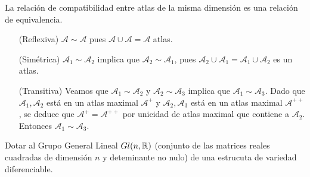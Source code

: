 \documentclass[twoside]{report}
\newcommand {\At} {{\mathcal{A}}}
\begin{document}
\begin{prop}
La relación de compatibilidad entre atlas de la misma dimensión es una relación de equivalencia.
\end{prop}

\begin{dem}\mbox{}
\begin{itemize}
	\item[(Reflexiva)] $\At \sim \At$ pues $\At \cup \At = \At$ atlas.
	\item[(Simétrica)] $\At_1 \sim \At_2$ implica que $\At_2 \sim \At_1$, pues $\At_2 \cup \At_1 = \At_1 \cup \At_2$ es un atlas.
	\item[(Transitiva)] Veamos que $\At_1 \sim \At_2$ y $\At_2 \sim \At_3$ implica que $\At_1 \sim \At_3$. Dado que $\At_1,\At_2$ está en un atlas maximal $\At^+$ y $\At_2,\At_3$ está en un atlas maximal $\At^{++}$, se deduce que $\At^+=\At^{++}$ por unicidad de atlas maximal que contiene a $\At_2$. Entonces $\At_1 \sim \At_3$.
\end{itemize}
\end{dem}


\begin{ejer}
Dotar al Grupo General Lineal $Gl(n,\mathbb{R})$ (conjunto de las matrices reales cuadradas de dimensión $n$ y deteminante no nulo) de una estrucuta de variedad diferenciable.
\end{ejer}
\end{document}
